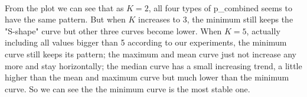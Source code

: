 \documentclass[10pt,english]{article}\usepackage{graphicx, color}
\numberwithin{equation}{section}
\numberwithin{figure}{section}
\begin{document}
\quad\\
From the plot we can see that as $K=2$, all four types of p\_combined seems to have the same pattern. But when $K$ increases to 3, the minimum still keeps the "S-shape" curve but other three curves become lower. When $K=5$, actually including all values bigger than 5 according to our experiments, the minimum curve still keeps its pattern; the maximum and mean curve just not increase any more and stay horizontally; the median curve has a small increasing trend, a little higher than the mean and maximum curve but much lower than the minimum curve. So we can see the the minimum curve is the most stable one.
\end{document}
